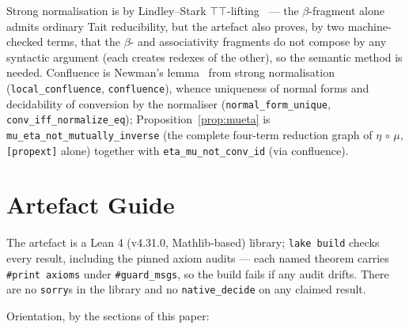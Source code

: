 \noindent Strong normalisation is by Lindley--Stark
\ensuremath{\top\top}-lifting~\cite{LindleyStark2005} --- the \ensuremath{\beta}-fragment
alone admits ordinary Tait reducibility, but the artefact also proves,
by two machine-checked terms, that the \ensuremath{\beta}- and associativity
fragments do not compose by any syntactic argument (each creates
redexes of the other), so the semantic method is needed. Confluence is
Newman's lemma~\cite{Newman1942} from strong normalisation
(\texttt{local\_confluence}, \texttt{confluence}), whence uniqueness of
normal forms and decidability of conversion by the normaliser
(\texttt{normal\_form\_unique}, \texttt{conv\_iff\_normalize\_eq});
Proposition~\ref{prop:mueta} is \texttt{mu\_eta\_not\_mutually\_inverse}
(the complete four-term reduction graph of \ensuremath{\eta} \ensuremath{\circ}
\ensuremath{\mu}, \texttt{[propext]} alone) together with
\texttt{eta\_mu\_not\_conv\_id} (via confluence).

\section{Artefact Guide}\label{app:artefact}

The artefact is a Lean 4 (v4.31.0, Mathlib-based) library; \texttt{lake
build} checks every result, including the pinned axiom audits — each
named theorem carries \texttt{\#print axioms} under
\texttt{\#guard\_msgs}, so the build fails if any audit drifts. There
are no \texttt{sorry}s in the library and no \texttt{native\_decide} on
any claimed result.

\medskip
\noindent Orientation, by the sections of this paper:


